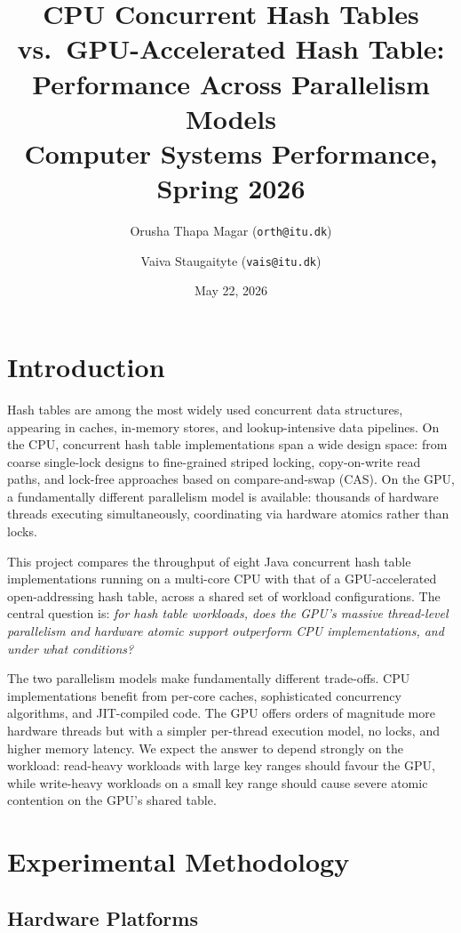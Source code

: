 \documentclass[11pt,a4paper]{article}
\title{\textbf{CPU Concurrent Hash Tables vs.\ GPU-Accelerated Hash Table:\\
Performance Across Parallelism Models}\\[0.5em]
\large Computer Systems Performance, Spring 2026}
\author{
  Orusha Thapa Magar (\texttt{orth@itu.dk}) \and
  Vaiva Staugaityte (\texttt{vais@itu.dk})
}
\date{May 22, 2026}
\begin{document}
\maketitle

\section{Introduction}

Hash tables are among the most widely used concurrent data structures, appearing
in caches, in-memory stores, and lookup-intensive data pipelines. On the CPU,
concurrent hash table implementations span a wide design space: from coarse
single-lock designs to fine-grained striped locking, copy-on-write read paths,
and lock-free approaches based on compare-and-swap (CAS). On the GPU, a
fundamentally different parallelism model is available: thousands of hardware
threads executing simultaneously, coordinating via hardware atomics rather than
locks.

This project compares the throughput of eight Java concurrent hash table
implementations running on a multi-core CPU with that of a GPU-accelerated
open-addressing hash table, across a shared set of workload configurations.
The central question is: \textit{for hash table workloads, does the GPU's
massive thread-level parallelism and hardware atomic support outperform
CPU implementations, and under what conditions?}

The two parallelism models make fundamentally different trade-offs. CPU
implementations benefit from per-core caches, sophisticated concurrency
algorithms, and JIT-compiled code. The GPU offers orders of magnitude more
hardware threads but with a simpler per-thread execution model, no locks, and
higher memory latency. We expect the answer to depend strongly on the workload:
read-heavy workloads with large key ranges should favour the GPU, while
write-heavy workloads on a small key range should cause severe atomic contention
on the GPU's shared table.

\section{Experimental Methodology}

\subsection{Hardware Platforms}
\end{document}
